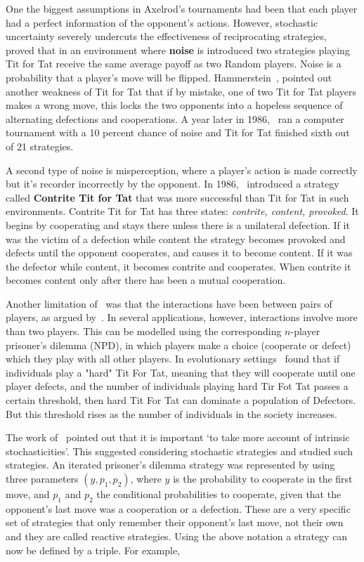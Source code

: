 \documentclass{article}
\theoremstyle{definition}
\begin{document}
One the biggest assumptions in Axelrod's tournaments had been that each player had a perfect
information of the opponent's actions. However, stochastic uncertainty severely undercuts
the effectiveness of reciprocating strategies,~\cite{Molander1985} proved that
in an environment where \textbf{noise} is introduced two strategies playing Tit
for Tat receive the same average payoff as two Random players.
Noise is a probability that a player's move will be
flipped. Hammerstein~\cite{Hammerstein1984}, pointed out another weakness of Tit
for Tat that if by mistake, one of two Tit for Tat players makes a wrong move,
this locks the two opponents into a hopeless sequence of alternating defections
and cooperations. A year later in 1986,~\cite{Donninger1986} ran a computer tournament with a
10 percent chance of noise and Tit for Tat finished sixth out of
21 strategies.

A second type of noise is misperception, where a player's action
is made correctly but it's recorder incorrectly by the opponent. In 1986,~\cite{Sugden2004}
introduced a strategy called
\textbf{Contrite Tit for Tat} that was more successful than Tit for Tat in such environments.
Contrite Tit for Tat has three states:
\textit{contrite, content, provoked}. It begins by cooperating and stays there unless
there is a unilateral defection. If it was the victim of a defection while content
the strategy becomes provoked and defects until the opponent cooperates, and 
causes it to become content. If it was the defector while content, it
becomes contrite and cooperates. When contrite it becomes content only after
there has been a mutual cooperation.

Another limitation of~\cite{axelrod1981} was that the
interactions have been between pairs of players, as argued by~\cite{Joshi1987}.
In several applications, however, interactions involve more
than two players. This can be modelled using the corresponding \(n\)-player prisoner's
dilemma (NPD), in which players make a choice (cooperate or defect) which they play
with all other players. In evolutionary settings~\cite{Joshi1987} found that if
individuals play a "hard" Tit For Tat, meaning that they will cooperate until one
player defects, and the number of individuals playing hard Tir Fot Tat passes a
certain threshold, then hard Tit For Tat can dominate a population of Defectors.
But this threshold rises as the number of individuals in the society increases.

The work of~\cite{May1987} pointed out that it is important `to take more account of intrinsic
stochasticities'. This suggested considering stochastic strategies and
\cite{nowak1989} studied such strategies. An iterated prisoner's dilemma strategy
was represented by using three parameters \((y, p_1, p_2)\), where \(y\) is the
probability to cooperate in the first move, and \(p_1\) and \(p_2\) the conditional probabilities
to cooperate, given that the opponent's last move was a cooperation or a defection.
These are a very specific set of strategies that only remember their
opponent's last move, not their own and they are called reactive strategies.
Using the above notation a strategy can now be defined by a triple. For example,
\end{document}
